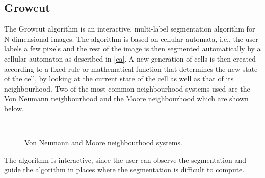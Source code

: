 \documentclass[a4paper,10pt]{article}
\begin{document}
\subsection{Growcut}
\label{growcut}
The Growcut algorithm is an interactive, multi-label segmentation algorithm
for N-dimensional images.  The algorithm is based on cellular automata, i.e.,
the user labels a few pixels and the rest of the image is then segmented
automatically by a cellular automaton as described in \ref{ca}. 
A new generation of cells is then created according to a fixed rule or
mathematical function that determines the new state of the cell, by looking at
the current state of the cell as well
as that of its neighbourhood.  Two of the most common neighbourhood systems used are the Von
Neumann neighbourhood and the Moore neighbourhood which are shown below. \\

\begin{figure}[H]
\centering
\mbox{ \quad
{}} \caption{Von Neumann and
Moore neighbourhood systems\cite{n}.}
\end{figure}

The algorithm is interactive, since the user can observe the segmentation and
guide the algorithm in places where the segmentation is difficult to compute.
\\
\end{document}
